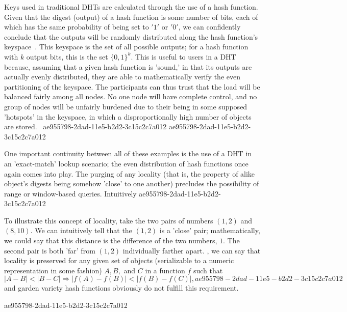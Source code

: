 \documentclass[12pt]{article}
\begin{document}
\par Keys used in traditional DHTs are calculated through the use of a hash function. Given that the digest (output) of a hash function is some number of bits, each of which has the same probability of being set to $'1'$ or $'0'$, we can confidently conclude that the outputs will be randomly distributed along the hash function's keyspace~. This keyspace is the set of all possible outputs; for a hash function with $k$ output bits, this is the set $\{0,1\}^k$. This is useful to users in a DHT because, assuming that a given hash function is 'sound,' in that its outputs are actually evenly distributed, they are able to mathematically verify the even partitioning of the keyspace. The participants can thus trust that the load will be balanced fairly among all nodes. No one node will have complete control, and no group of nodes will be unfairly burdened due to their being in some supposed 'hotspots' in the keyspace, in which a disproportionally high number of objects are stored.~
ae955798-2dad-11e5-b2d2-3c15c2c7a012
ae955798-2dad-11e5-b2d2-3c15c2c7a012\par One important continuity between all of these examples is the use of a DHT in an 'exact-match' lookup scenario; the even distribution of hash functions once again comes into play. The purging of any locality (that is, the property of alike object's digests being somehow 'close' to one another) precludes the possibility of range or window-based queries. Intuitively
ae955798-2dad-11e5-b2d2-3c15c2c7a012
\par To illustrate this concept of locality, take the two pairs of numbers $(1,2)$ and $(8,10)$. We can intuitively tell that the $(1,2)$ is a 'close' pair; mathematically, we could say that this distance is the difference of the two numbers, $1$. The second pair is both 'far' from $(1,2)$ individually farther apart. , we can say that locality is preserved for any given set of objects (serializable to a numeric representation in some fashion) $A,B,$ and $C$ in a function $f$ such that
\begin{equation}
|A-B| < |B-C| \Rightarrow |f(A)-f(B)| < |f(B) - f(C)|,
ae955798-2dad-11e5-b2d2-3c15c2c7a012\end{equation}
and garden variety hash functions obviously do not fulfill this requirement.

ae955798-2dad-11e5-b2d2-3c15c2c7a012\printbibliography
\end{document}
